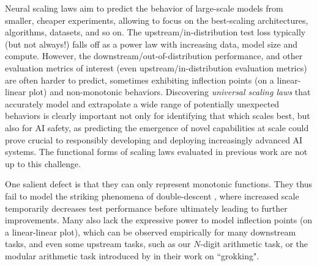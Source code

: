 \documentclass{article} %
\begin{document}
Neural scaling laws \citep{cortes1994learning,2017arXiv171200409H,DBLP:journals/corr/abs-1909-12673,icm2020arXiv200108361K,DBLP:journals/corr/abs-2106-04560,abnar2021exploring,Alabdulmohsi2022revisiting, brown2020language, bahri2021explaining} aim to predict the behavior of large-scale models from smaller, cheaper experiments, allowing to focus on the best-scaling architectures, algorithms, datasets, and so on. The upstream/in-distribution test loss typically (but not always!) falls off  as a power law with increasing  data, model size and compute. However, the downstream/out-of-distribution performance, and other evaluation metrics of interest (even upstream/in-distribution evaluation metrics) %
are often harder to predict, sometimes exhibiting inflection points (on a linear-linear plot) and non-monotonic behaviors. Discovering {\it universal scaling laws} that accurately model and extrapolate a wide range of potentially unexpected behaviors is clearly important not only for identifying that which scales best, but also for AI safety, as predicting the emergence of novel capabilities at scale could prove crucial to responsibly developing and deploying increasingly advanced AI systems. %
The functional forms of scaling laws evaluated in previous work are not up to this challenge.




\clearpage

\vspace*{-14.8mm}

One salient defect is that they can only represent monotonic functions.
They thus fail to model the striking phenomena of double-descent \citep{nakkiran2021deep}, where increased scale temporarily decreases test performance before ultimately leading to further improvements. %
Many also lack the expressive power to model inflection points (on a linear-linear plot), which can be observed empirically for many downstream tasks, and even some upstream tasks, such as our $N$-digit arithmetic task, or the modular arithmetic task introduced by \citet{power2022grokking} in their work on ``grokking".
\end{document}

